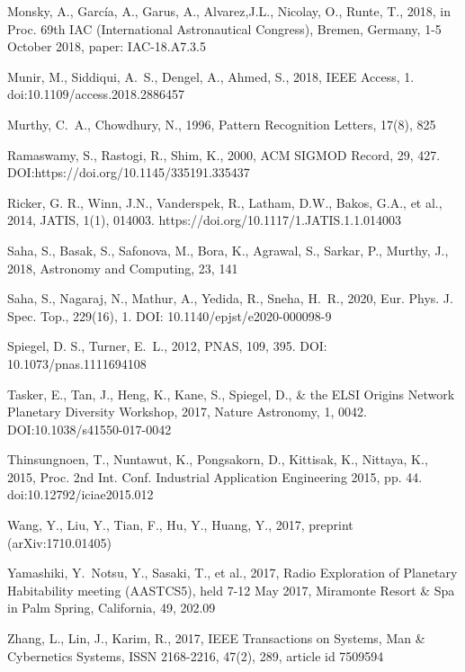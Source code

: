 \documentclass[fleqn,usenatbib]{mnras}
\begin{document}
\begin{thebibliography}{99}
 Monsky, A., García, A., Garus, A., Alvarez,J.L., Nicolay, O., Runte, T., 2018, in Proc. 69th IAC (International Astronautical Congress), Bremen, Germany, 1-5 October 2018, paper: IAC-18.A7.3.5


 Munir, M., Siddiqui, A.~S., Dengel, A., Ahmed, S., 2018, IEEE Access, 1. doi:10.1109/access.2018.2886457

 Murthy, C.~A., Chowdhury, N., 1996, Pattern Recognition Letters, 17(8), 825 

 Ramaswamy, S., Rastogi, R., Shim, K., 2000, ACM SIGMOD Record, 29, 427. DOI:https://doi.org/10.1145/335191.335437


 Ricker, G. R., Winn, J.N., Vanderspek, R., Latham, D.W., Bakos, G.A., et al., 2014,  JATIS, 1(1), 014003. https://doi.org/10.1117/1.JATIS.1.1.014003


 Saha, S., Basak, S., Safonova, M., Bora, K., Agrawal, S., Sarkar, P., Murthy, J., 2018, Astronomy and Computing, 23, 141

 Saha, S., Nagaraj, N., Mathur, A., Yedida, R., Sneha, H.~R., 2020, Eur. Phys. J. Spec. Top., 229(16), 1. DOI: 10.1140/epjst/e2020-000098-9
 
 Spiegel, D. S., Turner, E.~L., 2012, PNAS, 109, 395. DOI: 10.1073/pnas.1111694108

 Tasker, E., Tan, J., Heng, K., Kane, S., Spiegel, D., \& the ELSI Origins Network Planetary Diversity Workshop, 2017, Nature Astronomy, 1, 0042. DOI:10.1038/s41550-017-0042

 Thinsungnoen, T., Nuntawut, K.,  Pongsakorn, D., Kittisak, K., Nittaya, K., 2015, Proc. 2nd Int. Conf. Industrial Application Engineering 2015, pp. 44. doi:10.12792/iciae2015.012

 Wang, Y., Liu, Y., Tian, F., Hu, Y., Huang, Y., 2017, preprint (arXiv:1710.01405)

 Yamashiki, Y.~Notsu, Y., Sasaki, T., et al., 2017, Radio Exploration of Planetary Habitability meeting (AASTCS5), held 7-12 May 2017, Miramonte Resort \& Spa in Palm Spring, California, 49, 202.09

 Zhang, L., Lin, J., Karim, R., 2017, IEEE Transactions on Systems, Man \& Cybernetics Systems, ISSN 2168-2216, 47(2), 289, article id 7509594


\end{thebibliography}
\end{document}
